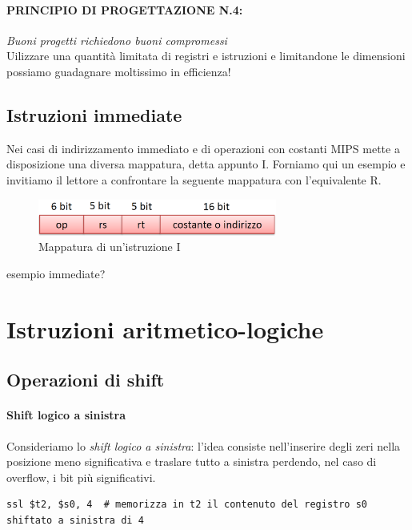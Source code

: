 \documentclass[class=book, crop=false]{standalone}
\begin{document}
\paragraph{PRINCIPIO DI PROGETTAZIONE N.4:}
\emph{Buoni progetti richiedono buoni compromessi}\\

Uilizzare una quantità limitata di registri e istruzioni e limitandone le dimensioni possiamo guadagnare moltissimo in efficienza!

\subsection{Istruzioni immediate}
Nei casi di indirizzamento immediato e di operazioni con costanti MIPS mette a disposizione una diversa mappatura, detta appunto I. Forniamo qui un esempio e invitiamo il lettore a confrontare la seguente mappatura con l'equivalente R.
\begin{figure}[H]
	\centering
	\includegraphics[width=0.7\textwidth,keepaspectratio]{I.png}
	\caption{Mappatura di un'istruzione I}
\end{figure}

esempio immediate?

\section{Istruzioni aritmetico-logiche}

\subsection{Operazioni di shift}

\paragraph{Shift logico a sinistra}
Consideriamo lo \emph{shift logico a sinistra}: l'idea consiste nell'inserire degli zeri nella posizione meno significativa e traslare tutto a sinistra perdendo, nel caso di overflow, i bit più significativi.

\begin{verbatim}
ssl $t2, $s0, 4  # memorizza in t2 il contenuto del registro s0 shiftato a sinistra di 4
\end{verbatim}
\end{document}
